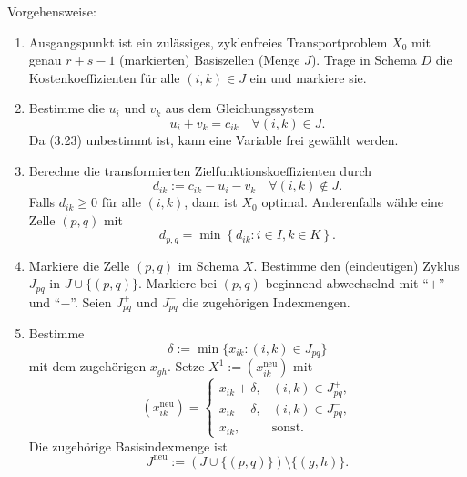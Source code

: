 Vorgehensweise:
\begin{enumerate}[(1)]
\item Ausgangspunkt ist ein zulässiges, zyklenfreies Transportproblem $X_0$ mit
  genau $r+s-1$ (markierten) Basiszellen (Menge $J$). Trage in Schema $D$ die
  Kostenkoeffizienten für alle $(i,k) \in J$ ein und markiere sie.
\item Bestimme die $u_i$ und $v_k$ aus dem Gleichungssystem
  \begin{equation} %
    u_i + v_k = c_{ik} \quad \forall (i,k) \in J.
  \end{equation}
  Da (3.23) unbestimmt ist, kann eine Variable frei gewählt werden.
\item Berechne die transformierten Zielfunktionskoeffizienten durch
  \[ d_{ik} := c_{ik} - u_i - v_k \quad \forall (i,k) \notin J. \]
  Falls $d_{ik} \ge 0$ für alle $(i,k)$, dann ist $X_0$ optimal. Anderenfalls
  wähle eine Zelle $(p,q)$ mit
  \[ d_{p,q} = \min \left\{  d_{ik} : i \in I, k \in K \right\}. \]
\item Markiere die Zelle $(p,q)$ im Schema $X$. Bestimme den (eindeutigen)
  Zyklus $J_{pq}$ in $J \cup \{(p,q)\}$. Markiere bei $(p,q)$ beginnend
  abwechselnd mit ``$+$'' und ``$-$''. Seien $J_{pq}^+$ und $J_{pq}^-$ die
  zugehörigen Indexmengen.
\item Bestimme
  \[ \delta := \min \{ x_{ik} : (i,k) \in J_{pq} \} \]
  mit dem zugehörigen $x_{gh}$. Setze $X^1 := (x_{ik}^{\mathrm{neu}})$ mit
  \[ (x_{ik}^{\mathrm{neu}}) =
    \begin{cases}
      x_{ik} + \delta, & (i,k) \in J_{pq}^+, \\
      x_{ik} - \delta, & (i,k) \in J_{pq}^-, \\
      x_{ik}, & \text{sonst.}
    \end{cases}
  \]
  Die zugehörige Basisindexmenge ist
  \[ J^{\mathrm{neu}} := ( J \cup \{(p,q)\} ) \setminus \{ (g,h) \}. \]
\end{enumerate}

